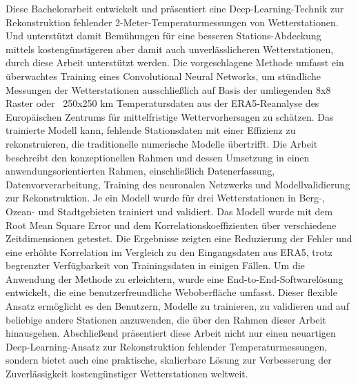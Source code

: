 Diese Bachelorarbeit entwickelt und präsentiert eine Deep-Learning-Technik zur Rekonstruktion fehlender 2-Meter-Temperaturmessungen von Wetterstationen.
Und unterstützt damit Bemühungen für eine besseren Stations-Abdeckung mittels kostengünstigeren aber damit auch unverlässlicheren Wetterstationen, durch diese Arbeit unterstützt werden.
Die vorgeschlagene Methode umfasst ein überwachtes Training eines Convolutional Neural Networks, um stündliche Messungen der Wetterstationen ausschließlich auf Basis der umliegenden 8x8 Raster oder ~250x250 km Temperatursdaten aus der ERA5-Reanalyse des Europäischen Zentrums für mittelfristige Wettervorhersagen zu schätzen.
Das trainierte Modell kann, fehlende Stationsdaten mit einer Effizienz zu rekonstruieren, die traditionelle numerische Modelle übertrifft.
Die Arbeit beschreibt den konzeptionellen Rahmen und dessen Umsetzung in einen anwendungsorientierten Rahmen, einschließlich Datenerfassung, Datenvorverarbeitung, Training des neuronalen Netzwerks und Modellvalidierung zur Rekonstruktion.
Je ein Modell wurde für drei Wetterstationen in Berg-, Ozean- und Stadtgebieten trainiert und validiert.
Das Modell wurde mit dem Root Mean Square Error und dem Korrelationskoeffizienten über verschiedene Zeitdimensionen getestet.
Die Ergebnisse zeigten eine Reduzierung der Fehler und eine erhöhte Korrelation im Vergleich zu den Eingangsdaten aus ERA5, trotz begrenzter Verfügbarkeit von Trainingsdaten in einigen Fällen.
Um die Anwendung der Methode zu erleichtern, wurde eine End-to-End-Softwarelösung entwickelt, die eine benutzerfreundliche Weboberfläche umfasst.
Dieser flexible Ansatz ermöglicht es den Benutzern, Modelle zu trainieren, zu validieren und auf beliebige andere Stationen anzuwenden, die über den Rahmen dieser Arbeit hinausgehen.
Abschließend präsentiert diese Arbeit nicht nur einen neuartigen Deep-Learning-Ansatz zur Rekonstruktion fehlender Temperaturmessungen, sondern bietet auch eine praktische, skalierbare Lösung zur Verbesserung der Zuverlässigkeit kostengünstiger Wetterstationen weltweit.